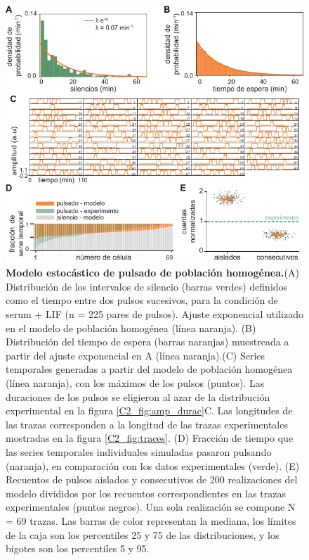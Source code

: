 \documentclass[./main.tex]{subfiles}
\begin{document}
\begin{figure}
    \centering
    \includegraphics[width=1\columnwidth]{figures/chapter2/C2_pulsado_estocastico_homog.pdf}\caption{\textbf{Modelo estocástico de pulsado de población homogénea.}(A) Distribución de los intervalos de silencio (barras verdes) definidos como el tiempo entre dos pulsos sucesivos, para la condición de serum + LIF (n = 225 pares de pulsos). Ajuste exponencial utilizado en el modelo de población homogénea (línea naranja). (B) Distribución del tiempo de espera (barras naranjas) muestreada a partir del ajuste exponencial en A (línea naranja).(C) Series temporales generadas a partir del modelo de población homogénea (línea naranja), con los máximos de los pulsos (puntos). Las duraciones de los pulsos se eligieron al azar de la distribución experimental en la figura \ref{C2_fig:amp_durac}C. Las longitudes de las trazas corresponden a la longitud de las trazas experimentales mostradas en la figura \ref{C2_fig:traces}. (D) Fracción de tiempo que las series temporales individuales simuladas pasaron pulsando (naranja), en comparación con los datos experimentales (verde). (E) Recuentos de pulsos aislados y consecutivos de 200 realizaciones del modelo divididos por los recuentos correspondientes en las trazas experimentales (puntos negros). Una sola realización se compone N = 69 trazas. Las barras de color representan la mediana, los límites de la caja son los percentiles 25 y 75 de las distribuciones, y los bigotes son los percentiles 5 y 95. }
    \label{C2_fig:pulsos_estocasticos_homog}
\end{figure}
\end{document}
